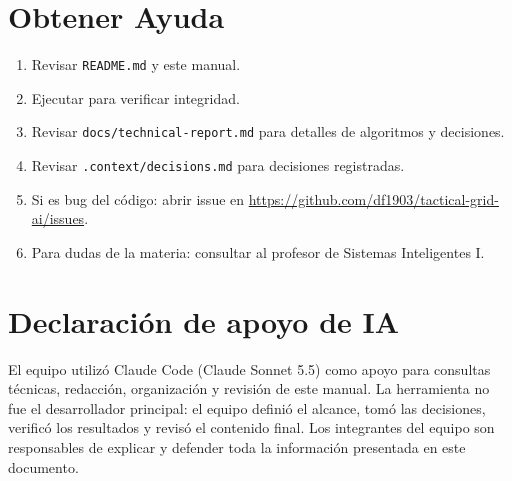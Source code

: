 \section{Obtener Ayuda}
\label{sec:ayuda}

\begin{enumerate}
\item Revisar \texttt{README.md} y este manual.
\item Ejecutar  para verificar integridad.
\item Revisar \texttt{docs/technical-report.md} para detalles de algoritmos y decisiones.
\item Revisar \texttt{.context/decisions.md} para decisiones registradas.
\item Si es bug del código: abrir issue en \url{https://github.com/df1903/tactical-grid-ai/issues}.
\item Para dudas de la materia: consultar al profesor de Sistemas Inteligentes I.
\end{enumerate}

\section{Declaración de apoyo de IA}
\label{sec:manual-apoyo-ia}

El equipo utilizó Claude Code (Claude Sonnet 5.5) como apoyo para consultas técnicas,
redacción, organización y revisión de este manual. La herramienta no fue el desarrollador
principal: el equipo definió el alcance, tomó las decisiones, verificó los resultados y
revisó el contenido final. Los integrantes del equipo son responsables de explicar y
defender toda la información presentada en este documento.